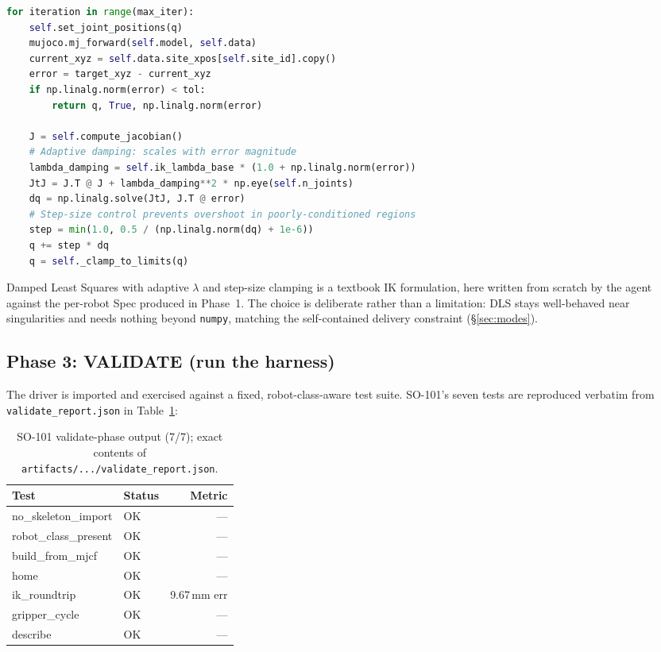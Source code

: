 \begin{lstlisting}[basicstyle=\ttfamily\scriptsize, frame=single, framerule=0pt,
    backgroundcolor=\color{gray!10}, columns=fullflexible, breaklines=true,
    language=Python]
for iteration in range(max_iter):
    self.set_joint_positions(q)
    mujoco.mj_forward(self.model, self.data)
    current_xyz = self.data.site_xpos[self.site_id].copy()
    error = target_xyz - current_xyz
    if np.linalg.norm(error) < tol:
        return q, True, np.linalg.norm(error)

    J = self.compute_jacobian()
    # Adaptive damping: scales with error magnitude
    lambda_damping = self.ik_lambda_base * (1.0 + np.linalg.norm(error))
    JtJ = J.T @ J + lambda_damping**2 * np.eye(self.n_joints)
    dq = np.linalg.solve(JtJ, J.T @ error)
    # Step-size control prevents overshoot in poorly-conditioned regions
    step = min(1.0, 0.5 / (np.linalg.norm(dq) + 1e-6))
    q += step * dq
    q = self._clamp_to_limits(q)
\end{lstlisting}

Damped Least Squares with adaptive $\lambda$ and step-size clamping
is a textbook IK formulation, here written from scratch by the
agent against the per-robot Spec produced in Phase~1. The choice
is deliberate rather than a limitation: DLS stays well-behaved
near singularities and needs nothing beyond \texttt{numpy},
matching the self-contained delivery constraint (\S\ref{sec:modes}).

\subsection{Phase 3: VALIDATE (run the harness)}

The driver is imported and exercised against a fixed,
robot-class-aware test suite. SO-101's seven tests are reproduced
verbatim from \texttt{validate\_report.json} in Table~\ref{tab:validate}:

\begin{table}[H]
\centering
\small
\begin{tabular}{llr}
\toprule
\textbf{Test} & \textbf{Status} & \textbf{Metric} \\
\midrule
no\_skeleton\_import  & OK & --- \\
robot\_class\_present & OK & --- \\
build\_from\_mjcf     & OK & --- \\
home                  & OK & --- \\
ik\_roundtrip         & OK & 9.67\,mm err \\
gripper\_cycle        & OK & --- \\
describe              & OK & --- \\
\bottomrule
\end{tabular}
\caption{SO-101 validate-phase output (7/7); exact contents of
\texttt{artifacts/.../validate\_report.json}.}
\label{tab:validate}
\end{table}

